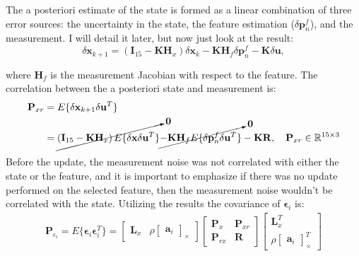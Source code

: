 The a posteriori estimate of the state is formed as a linear combination of three error sources: the uncertainty in the state, the feature estimation ($\delta\mathbf{p}_n^f$), and the measurement. I will detail it later, but now just look at the result:
\begin{equation}
    \delta\mathbf{x}_{k+1}=\left(\mathbf{I}_{15}-\mathbf{K}\mathbf{H}_x\right)\delta\mathbf{x}_k-\mathbf{K}\mathbf{H}_f\delta\mathbf{p}_n^f - \mathbf{K}\delta\mathbf{u},
    \label{eq:aposteriori-state}
\end{equation}

where $\mathbf{H}_f$ is the measurement Jacobian with respect to the feature. The correlation between the a posteriori state and measurement is:
\begin{equation}
\begin{aligned}    
    \mathbf{P}_{xr} &= E\{\delta\mathbf{x}_{k+1}\delta\mathbf{u}^T\} \\ &= 
    \cancelto{\mathbf{0}}{\left(\mathbf{I}_{15}-\mathbf{K}\mathbf{H}_x\right)E\{\delta\mathbf{x}\delta\mathbf{u}^T\}}\cancelto{\mathbf{0}}{-\mathbf{K}\mathbf{H}_f E\{\delta\mathbf{p}_n^f\delta\mathbf{u}^T\}} - \mathbf{K}\mathbf{R},\quad\mathbf{P}_{xr}\in\mathbb{R}^{15\times 3}
\end{aligned}
\end{equation}

Before the update, the measurement noise was not correlated with either the state or the feature, and it is important to emphasize if there was no update performed on the selected feature, then the measurement noise wouldn't be correlated with the state. Utilizing the results the covariance of $\boldsymbol{\epsilon}_i$ is:
\begin{equation}
\begin{aligned}
    \mathbf{P}_{\epsilon_i}= E\{\boldsymbol{\epsilon}_i\boldsymbol{\epsilon}_i^T\} = 
    \begin{bmatrix}
        \mathbf{L}_x &  
        \rho\begin{bmatrix}
            \mathbf{a}_i
        \end{bmatrix}_\times
    \end{bmatrix}
    \begin{bmatrix}
        \mathbf{P}_x & \mathbf{P}_{xr} \\
        \mathbf{P}_{rx} & \mathbf{R}
    \end{bmatrix}
    \begin{bmatrix}
        \mathbf{L}_x^T \\  
        \rho\begin{bmatrix}
            \mathbf{a}_i
        \end{bmatrix}_\times^T
    \end{bmatrix}
\end{aligned}
\end{equation}

